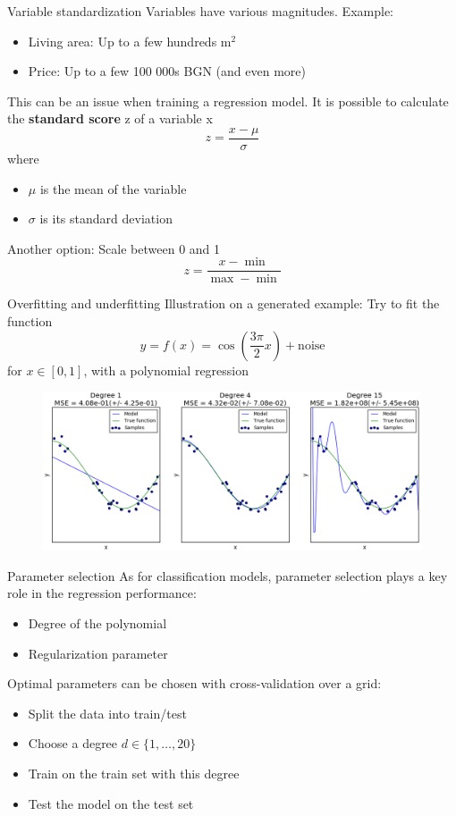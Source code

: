 \documentclass{beamer}
\begin{document}
\begin{frame}{Variable standardization}
Variables have various magnitudes. Example:
\begin{itemize}
	\item Living area: Up to a few hundreds m$^2$
	\item Price: Up to a few 100 000s BGN (and even more)
\end{itemize}
This can be an issue when training a regression model.
\vfill
\pause
It is possible to calculate the \textbf{standard score} z of a variable x
$$ z = \dfrac{x - \mu}{\sigma}$$
where
\begin{itemize}
	\item $\mu$ is the mean of the variable
	\item $\sigma$ is its standard deviation
\end{itemize}
\pause
\vfill
Another option: Scale between 0 and 1
$$ z = \dfrac{x - \min}{\max - \min}$$
\end{frame}

\begin{frame}{Overfitting and underfitting}
Illustration on a generated example: Try to fit the function
$$ y = f(x) = \cos \left( \dfrac{3\pi}{2} x \right) + \text{noise}$$
for $x \in [0, 1]$, with a polynomial regression
\pause
\begin{figure}
\centering
\includegraphics[width=\textwidth]{images/over_under_fitting.png}
\end{figure}
\end{frame}

\begin{frame}{Parameter selection}
As for classification models, parameter selection plays a key role in the regression performance:
\begin{itemize}
	\item Degree of the polynomial
	\item Regularization parameter
\end{itemize}
\vfill
\pause
Optimal parameters can be chosen with cross-validation over a grid:
\pause
\begin{itemize}
	\item Split the data into train/test
\pause
	\item Choose a degree $d \in \{ 1,  \dots, 20\}$
\pause
	\item Train on the train set with this degree
\pause
	\item Test the model on the test set
\end{itemize}
\end{frame}
\end{document}
